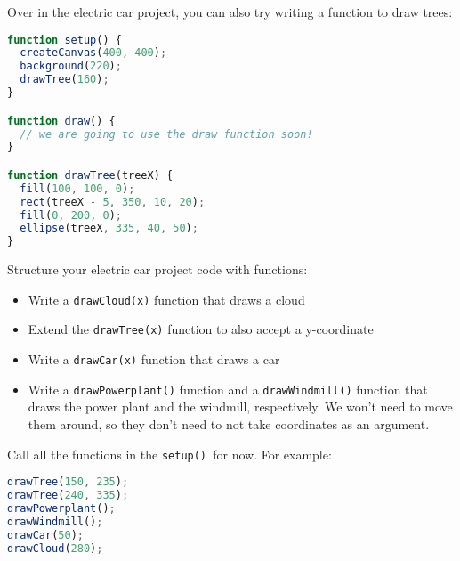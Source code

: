 \begin{exercisebox}[adjusted title=Green City continued]
Over in the electric car project, you can also try writing a function
to draw trees:
\begin{lstlisting}[language=JavaScript]
 function setup() {
  createCanvas(400, 400);
  background(220);
  drawTree(160);
}

function draw() {
  // we are going to use the draw function soon!
}

function drawTree(treeX) {
  fill(100, 100, 0);
  rect(treeX - 5, 350, 10, 20);
  fill(0, 200, 0);
  ellipse(treeX, 335, 40, 50);
}
\end{lstlisting}

\noindent
Structure your electric car project code with functions:
\begin{itemize}
\item Write a \texttt{drawCloud(x)} function that draws a cloud
\item Extend the \texttt{drawTree(x)} function to also accept a y-coordinate
\item Write a \texttt{drawCar(x)} function that draws a car
\item Write a \texttt{drawPowerplant()} function and a
  \texttt{drawWindmill()} function that draws the power plant and
  the windmill, respectively. We won't need to move them around, so they don't need to
  not take coordinates as an argument.
\end{itemize}
\noindent
Call all the functions in the \texttt{setup() }for now. For example:

\begin{lstlisting}[language=JavaScript]
drawTree(150, 235);
drawTree(240, 335);
drawPowerplant();
drawWindmill();
drawCar(50);
drawCloud(280);
\end{lstlisting}

\end{exercisebox}
